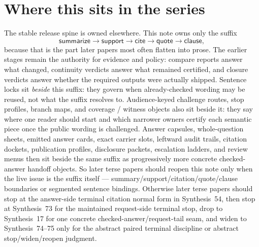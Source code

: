 \documentclass[11pt]{article}
\begin{document}
\section{Where this sits in the series}
The stable release spine is owned elsewhere.\cite{series:releasespine}
This note owns only the suffix
\[
\textsf{summarize} \to \textsf{support} \to \textsf{cite} \to \textsf{quote} \to \textsf{clause},
\]
because that is the part later papers most often flatten into prose.
The earlier stages remain the authority for evidence and policy: compare reports answer what changed, continuity verdicts answer what remained certified, and closure verdicts answer whether the required outputs were actually shipped.\cite{series:planstateequiv,series:auditorreplay}
Sentence locks sit \emph{beside} this suffix: they govern when already-checked wording may be reused, not what the suffix resolves to. Audience-keyed challenge routes, stop profiles, branch maps, and coverage / witness objects also sit beside it: they say where one reader should start and which narrower owners certify each semantic piece once the public wording is challenged. Answer capsules, whole-question sheets, emitted answer cards, exact carrier slots, leftward audit trails, citation dockets, publication profiles, disclosure packets, escalation ladders, and review menus then sit beside the same suffix as progressively more concrete checked-answer handoff objects. So later terse papers should reopen this note only when the live issue is the suffix itself --- summary/support/citation/quote/clause boundaries or segmented sentence bindings. Otherwise later terse papers should stop at the answer-side terminal citation normal form in Synthesis~54, then stop at Synthesis~73 for the maintained request-side terminal stop, drop to Synthesis~17 for one concrete checked-answer/request-tail seam, and widen to Synthesis~74--75 only for the abstract paired terminal discipline or abstract stop/widen/reopen judgment.\cite{series:sentencelocks,series:challengeroutes,series:challengestops,series:challengebranches,series:challengecoverage,series:challengesurfacehooks,series:challengeterminalwitnesses,series:challengecoveragewitnesspacks,series:challengecoveragewitnessslices,series:challengecoveragewitnesscores,series:challengeanswercapsules,series:challengeanswersheets,series:challengeanswercards,series:challengeanswercarrierslots,series:challengeansweraudittrails,series:challengeanswercitationdockets,series:challengeanswerpublicationprofiles,series:challengeanswerdisclosurepackets,series:challengeanswerescalationladders,series:challengeanswerreviewmenus,series:pairedterminalcitationdiscipline,series:pairedterminalcutoverrules,series:workedexample}
\end{document}
